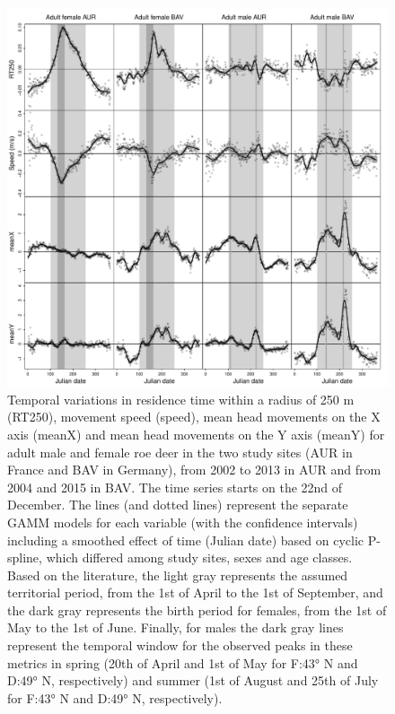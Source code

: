 \documentclass[a4paper,11pt]{article}
\begin{document}
\newpage
\begin{figure} [ht!]
  \centering
  \includegraphics[width=0.9\linewidth]{./figures/Fig2NB.pdf}
  \caption{Temporal variations in residence time within a radius of
    250 m (RT250), movement speed (speed), mean head movements on the
    X axis (meanX) and mean head movements on the Y axis (meanY) for
    adult male and female roe deer in the two study sites (AUR in
    France and BAV in Germany), from 2002 to 2013 in AUR and from 2004
    and 2015 in BAV. The time series starts on the 22nd of
    December. The lines (and dotted lines) represent the separate GAMM
    models for each variable (with the confidence intervals) including
    a smoothed effect of time (Julian date) based on cyclic P-spline,
    which differed among study sites, sexes and age classes. Based on
    the literature, the light gray represents the assumed territorial
    period, from the 1st of April to the 1st of September, and the
    dark gray represents the birth period for females, from the 1st of
    May to the 1st of June. Finally, for males the dark gray lines
    represent the temporal window for the observed peaks in these
    metrics in spring (20th of April and 1st of May for F:43° N and
    D:49° N, respectively) and summer (1st of August and 25th of July
    for F:43° N and D:49° N, respectively).}\label{fig:sex}
\end{figure}
\end{document}
